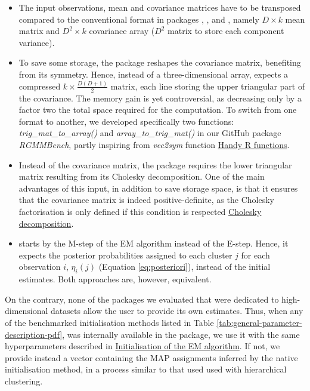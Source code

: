 \begin{itemize}
\item
  The input observations, mean and covariance matrices have to be transposed compared to the conventional format in packages , ,  and , namely \(D \times k\) mean matrix and \(D^2 \times k\) covariance array (\(D^2\) matrix to store each component variance).
\item
  To save some storage, the  package reshapes the covariance matrix, benefiting from its symmetry. Hence, instead of a three-dimensional array,  expects a compressed \(k \times \frac{D(D+1)}{2}\) matrix, each line storing the upper triangular part of the covariance. The memory gain is yet controversial, as decreasing only by a factor two the total space required for the computation. To switch from one format to another, we developed specifically two functions: \emph{trig\_mat\_to\_array()} and \emph{array\_to\_trig\_mat()} in our GitHub package \emph{RGMMBench}, partly inspiring from \emph{vec2sym} function \href{https://rdrr.io/github/patr1ckm/patr1ckm/man/vec2sym.html}{Handy R functions}.
\item
  Instead of the covariance matrix, the  package requires the lower triangular matrix resulting from its Cholesky decomposition. One of the main advantages of this input, in addition to save storage space, is that it ensures that the covariance matrix is indeed positive-definite, as the Cholesky factorisation is only defined if this condition is respected \href{https://en.wikipedia.org/wiki/Cholesky_decomposition}{Cholesky decomposition}.
\item
   starts by the M-step of the EM algorithm instead of the E-step. Hence, it expects the posterior probabilities assigned to each cluster \(j\) for each observation \(i\), \(\eta_i(j)\) (Equation \eqref{eq:posteriori}), instead of the initial estimates. Both approaches are, however, equivalent.
\end{itemize}

\color{blue}

On the contrary, none of the packages we evaluated that were dedicated to high-dimensional datasets allow the user to provide its own estimates. Thus, when any of the benchmarked initialisation methods listed in Table \ref{tab:general-parameter-description-pdf}, was internally available in the package, we use it with the same hyperparameters described in \protect\hyperlink{initialisation-of-the-em-algorithm}{Initialisation of the EM algorithm}. If not, we provide instead a vector containing the MAP assignments inferred by the native initialisation method, in a process similar to that used used with hierarchical clustering.
\color{black}

